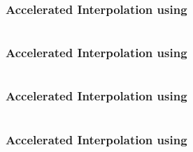 \begin{frame}[t]
	\frametitle{Accelerated Interpolation using \qvasr}
	\begin{columns}
		\begin{column}{0.35\textwidth}
			\resizebox{0.8\textwidth}{!}{}
		\end{column}
		\begin{column}{0.55\textwidth}
			\resizebox{0.77\textwidth}{!}{}
		\end{column}
	\end{columns}
\end{frame}

\begin{frame}[t]
	\frametitle{Accelerated Interpolation using \qvasr}
	\begin{columns}
		\begin{column}{0.35\textwidth}
			\resizebox{0.8\textwidth}{!}{}
		\end{column}
		\begin{column}{0.55\textwidth}
			\resizebox{0.4\textwidth}{!}{}
		\end{column}
	\end{columns}
\end{frame}

\begin{frame}[t]
	\frametitle{Accelerated Interpolation using \qvasr}
	\begin{columns}
		\begin{column}{0.35\textwidth}
			\resizebox{0.8\textwidth}{!}{}
		\end{column}
		\begin{column}{0.55\textwidth}
				\resizebox{0.5\textwidth}{!}{}
		\end{column}
	\end{columns}
\end{frame}

\begin{frame}[t]
	\frametitle{Accelerated Interpolation using \qvasr}
	\begin{columns}
		\begin{column}{0.35\textwidth}
			\resizebox{0.8\textwidth}{!}{}
		\end{column}
		\begin{column}{0.3\textwidth}
			\resizebox{\textwidth}{!}{}
			\vspace*{1cm}
			\only<1>{$post(x = 0, \psi)$ = $x \leq 22$}
		\end{column}
		\begin{column}{0.3\textwidth}
			\begin{center}
				\resizebox{0.75\textwidth}{!}{}
			\end{center}
		\end{column}
	\end{columns}
\end{frame}